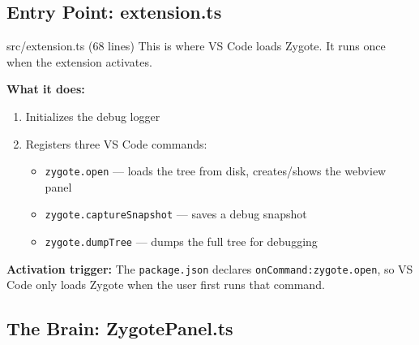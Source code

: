 \documentclass[12pt, a4paper]{article}
\begin{document}
\subsection{Entry Point: extension.ts}

\begin{filebox}{src/extension.ts \quad (68 lines)}
This is where VS Code loads Zygote. It runs once when the extension activates.

\textbf{What it does:}
\begin{enumerate}
    \item Initializes the debug logger
    \item Registers three VS Code commands:
    \begin{itemize}
        \item \texttt{zygote.open} --- loads the tree from disk, creates/shows the webview panel
        \item \texttt{zygote.captureSnapshot} --- saves a debug snapshot
        \item \texttt{zygote.dumpTree} --- dumps the full tree for debugging
    \end{itemize}
\end{enumerate}

\textbf{Activation trigger:} The \texttt{package.json} declares \texttt{onCommand:zygote.open}, so VS Code only loads Zygote when the user first runs that command.
\end{filebox}

\subsection{The Brain: ZygotePanel.ts}
\end{document}
